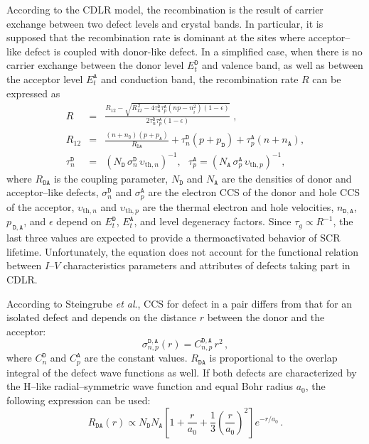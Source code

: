 \documentclass[aip,jap, amsmath,amssymb,reprint]{revtex4-1}
\begin{document}
According to the CDLR model, the recombination is the result of carrier exchange between two defect levels and crystal bands.
In particular, it is supposed\cite{CDLR:JAP} that the recombination rate is dominant at the sites where acceptor--like defect is coupled with donor-like defect.
In a simplified case, when there is no carrier exchange between the donor level $E_t^{\mathtt{D}}$ and valence band,
as well as between the acceptor level $E_t^{\mathtt{A}}$ and conduction band,
the recombination rate $R$ can be expressed\cite{CDLR:JAP1995} as
\begin{eqnarray}
R&=&\frac{R_{12}-\sqrt{R_{12}^{\,2}-4\tau_{n}^{\mathtt{D}}\tau_{p}^{\mathtt{A}}(np-n_i^2)(1-\epsilon)}}{2\tau_{n}^{\mathtt{D}}\tau_{p}^{\mathtt{A}}(1-\epsilon)}\;,\label{eqR}\\
R_{12}&=&\frac{(n+n_{\mathtt{D}})(p+p_{\mathtt{A}})}{R_{\mathtt{DA}}}+
\tau_{n}^{\mathtt{D}}(p+p_{\mathtt{D}})+\tau_{p}^{\mathtt{A}}(n+n_{\mathtt{A}}),\label{eqR12}\\
\tau_{n}^{\mathtt{D}}&=&(N_{\mathtt{D}}\,\sigma_{n}^{\mathtt{D}}\,\upsilon_{\mathrm{th},n})^{-1},\,\,\,\,
\tau_{p}^{\mathtt{A}}=(N_{\mathtt{A}}\,\sigma_{p}^{\mathtt{A}}\,\upsilon_{\mathrm{th},p})^{-1},\label{eqTAU}
\end{eqnarray}
where
$R_{\mathtt{DA}}$ is the coupling parameter,
$N_{\mathtt{D}}$ and $N_{\mathtt{A}}$ are the densities of donor and acceptor--like defects,
$\sigma_{n}^{\mathtt{D}}$ and $\sigma_{p}^{\mathtt{A}}$ are the electron CCS of the donor and hole CCS of the acceptor,
$\upsilon_{\mathrm{th},n}$ and $\upsilon_{\mathrm{th},p}$ are the thermal electron and hole velocities,
$n_{\mathtt{D,A}}$, $p_{\,\mathtt{D,A}}$, and $\epsilon$ depend on $E_t^{\mathtt{D}}$, $E_t^{\mathtt{A}}$, and level degeneracy  factors.
Since $\tau_g\propto R^{-1}$, the last three values are expected to provide a thermoactivated behavior of SCR lifetime.
Unfortunately, the equation does not account for the functional relation between $I$--$V$ characteristics parameters and attributes of defects taking part in CDLR.


According to Steingrube \emph{et al}.\cite{CDLR:JAP},
CCS for defect in a pair differs from that for an isolated defect and depends on the distance $r$ between the donor and the acceptor:
\begin{equation}
\label{eqSigma}
\sigma_{n,p}^{\mathtt{D,A}}(r)=C_{n,p}^{\mathtt{D,A}}\,r^2\,,
\end{equation}
where $C_{n}^{\mathtt{D}}$ and $C_{p}^{\mathtt{A}}$ are the constant values.
$R_{\mathtt{DA}}$ is proportional to the overlap integral of the defect wave functions as well.
If both defects are characterized by the H--like radial--symmetric wave function and equal Bohr radius $a_0$,
the following expression can be used: \cite{CDLR:JAP}
\begin{equation}
\label{eqRda}
R_{\mathtt{DA}} (r) \propto N_{\mathtt{D}}N_{\mathtt{A}}\left[1+\frac{r}{a_0}+\frac{1}{3}\left(\frac{r}{a_0}\right)^2\right]
   e^{-r/a_0}\,.
\end{equation}
\end{document}
